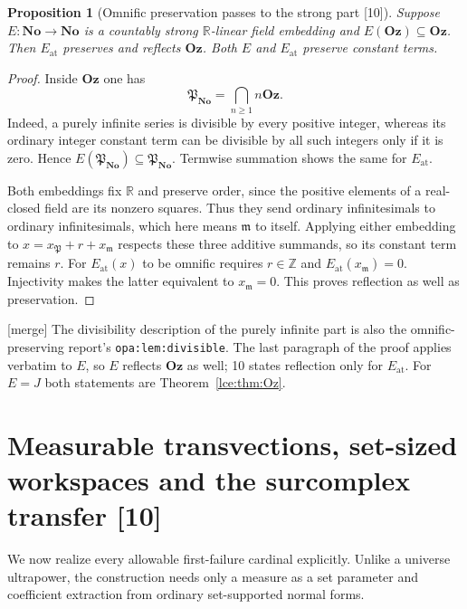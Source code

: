 \documentclass[11pt,letterpaper]{article}
\numberwithin{equation}{section}
\newtheorem{proposition}[theorem]{Proposition}
\theoremstyle{definition}
\theoremstyle{remark}
\newcommand{\No}{\mathbf{No}}
\newcommand{\Oz}{\mathbf{Oz}}
\newcommand{\R}{\mathbb R}
\newcommand{\Z}{\mathbb Z}
\newcommand{\infideal}{\mathfrak m}
\newcommand{\thref}[1]{Theorem~\ref{#1}}
\newcommand{\src}[1]{\textup{\textsf{\small[#1]}}}%
\newcommand{\mergetag}{\textup{\textsf{\small[merge]}}}%
\newcommand{\lbl}[1]{\nolinkurl{#1}}%
\newcommand{\at}{\mathrm{at}}
\begin{document}
\begin{proposition}[Omnific preservation passes to the strong part \src{10}]\label{lce:mf:prop:omnificpart}
Suppose $E:\No\to\No$ is a countably strong $\R$-linear field embedding and
$E(\Oz)\subseteq\Oz$. Then $E_{\at}$ preserves and reflects $\Oz$. Both $E$
and $E_{\at}$ preserve constant terms.
\end{proposition}
\begin{proof}
Inside $\Oz$ one has
\[
 \mathfrak P_{\No}=\bigcap_{n\ge1}n\Oz.
\]
Indeed, a purely infinite series is divisible by every positive integer,
whereas its ordinary integer constant term can be divisible by all such
integers only if it is zero. Hence $E(\mathfrak P_{\No})\subseteq\mathfrak
P_{\No}$. Termwise summation shows the same for $E_{\at}$.

Both embeddings fix $\R$ and preserve order, since the positive elements of
a real-closed field are its nonzero squares. Thus they send ordinary
infinitesimals to ordinary infinitesimals, which here means $\infideal$ to
itself. Applying either embedding to $x=x_{\mathfrak P}+r+x_{\infideal}$
respects these three additive summands, so its constant term remains $r$.
For $E_{\at}(x)$ to be omnific requires $r\in\Z$ and
$E_{\at}(x_{\infideal})=0$. Injectivity makes the latter equivalent to
$x_{\infideal}=0$. This proves reflection as well as preservation.
\end{proof}
\mergetag{} The divisibility description of the purely infinite part is
also the omnific-preserving report's \lbl{opa:lem:divisible}. The last
paragraph of the proof applies verbatim to $E$, so $E$ reflects $\Oz$ as
well; 10 states reflection only for $E_{\at}$. For $E=J$ both statements
are \thref{lce:thm:Oz}.

\section{Measurable transvections, set-sized workspaces and the surcomplex transfer \src{10}}
\label{lce:mf:sec:shears}

We now realize every allowable first-failure cardinal explicitly. Unlike a
universe ultrapower, the construction needs only a measure as a set
parameter and coefficient extraction from ordinary set-supported normal
forms.
\end{document}
